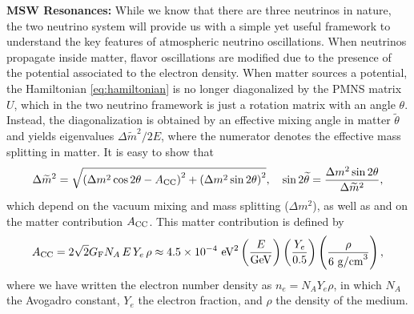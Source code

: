 \textbf{MSW Resonances:} While we know that there are three neutrinos in nature, the two neutrino system will provide us with a simple yet useful framework to understand the key features of atmospheric neutrino oscillations.
When neutrinos propagate inside matter, flavor oscillations are modified due to the presence of the potential associated to the electron density. 
When matter sources a potential, the Hamiltonian \eqref{eq:hamiltonian} is no longer diagonalized by the PMNS matrix $U$, which in the two neutrino framework is just a rotation matrix with an angle $\theta$.
Instead, the diagonalization is obtained by an effective mixing angle in matter $\widetilde\theta$ and yields eigenvalues   $\Delta\tilde m^2/2E$, where the numerator denotes the effective mass splitting in matter.
It is easy to show that
\begin{align}
	\Delta\widetilde m^2=\sqrt{\left(\Delta m^2 \cos 2\theta - A_{\rm CC}\right)^2+\left(\Delta m^2 \sin 2\theta\right)^2},\quad \sin 2\widetilde\theta =\frac{\Delta m^2 \sin 2\theta}{\Delta\widetilde m^2},
\end{align}
which depend on the vacuum mixing and mass splitting ($\Delta m^2$), as well as and on the matter contribution $A_{\rm CC}$.
This matter contribution is defined by
\begin{align}
 	A_{\rm CC} = 2\sqrt{2}G_{\rm F} N_A\, E\, Y_e\, \rho \approx 4.5 \times 10^{-4}\ \mathrm{eV}^2 \left(\frac{E}{\mathrm{GeV}}\right) \left(\frac{Y_e}{0.5}\right) \left(\frac{\rho}{6\ \mathrm{g/cm}^3}\right),
\end{align}
where we have written the electron number density as $n_e = N_A Y_e \rho$, in which $N_A$ the Avogadro constant, $Y_e$ the electron fraction, and $\rho$ the density of the medium. 

